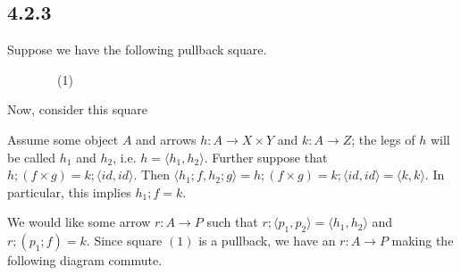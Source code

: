 \documentclass{article}
\begin{document}
\subsection*{4.2.3}
Suppose we have the following pullback square.
\begin{center}
~~~~~~~~(1)
\end{center}
Now, consider this square
\begin{center}
\end{center}
Assume some object $A$ and arrows $h : A \to X \times Y$ and $k : A \to Z$; the legs of $h$ will be called
$h_1$ and $h_2$, i.e. $h = \langle h_1, h_2 \rangle$. Further suppose that $h;(f \times g) = k;\langle id, id \rangle$.
Then $\langle h_1;f, h_2;g \rangle = h;(f \times g) = k;\langle id, id \rangle = \langle k, k \rangle$.
In particular, this implies $h_1;f = k$.
\begin{center}
\end{center}

We would like some arrow $r : A \to P$ such that $r;\langle p_1, p_2 \rangle = \langle h_1, h_2 \rangle$ and $r;(p_1;f) = k$.
Since square $(1)$ is a pullback, we have an $r : A \to P$ making the following diagram commute.

\begin{center}
\end{center}
\end{document}
